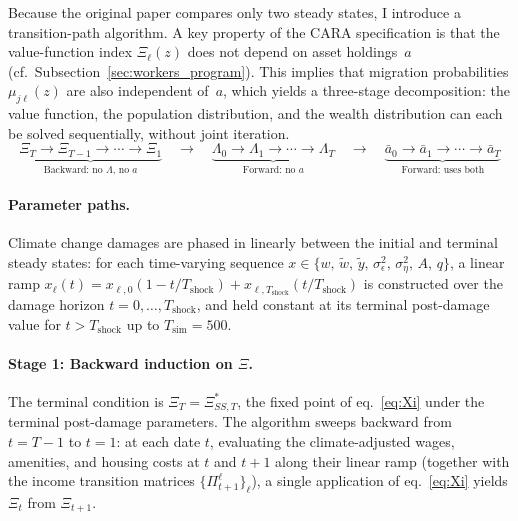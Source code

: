 \documentclass[11pt, a4paper]{article}
\begin{document}
Because the original paper compares only two steady states, I introduce a transition-path algorithm. A key property of the CARA specification is that the value-function index $\Xi_\ell(z)$ does not depend on asset holdings~$a$ (cf.\ Subsection~\ref{sec:workers_program}). This implies that migration probabilities $\mu_{j\ell}(z)$ are also independent of~$a$, which yields a three-stage decomposition: the value function, the population distribution, and the wealth distribution can each be solved sequentially, without joint iteration.
\begin{equation}
  \underbrace{\Xi_T \to \Xi_{T-1} \to \cdots \to \Xi_1}_{\text{Backward: no $\Lambda$, no $a$}}
  \quad\longrightarrow\quad
  \underbrace{\Lambda_0 \to \Lambda_1 \to \cdots \to \Lambda_T}_{\text{Forward: no $a$}}
  \quad\longrightarrow\quad
  \underbrace{\bar a_0 \to \bar a_1 \to \cdots \to \bar a_T}_{\text{Forward: uses both}}
  \label{eq:three_stage}
\end{equation}

\paragraph{Parameter paths.} Climate change damages are phased in linearly between the initial and terminal steady states: for each time-varying sequence $x \in \{w,\, \tilde w,\, \tilde y,\, \sigma^2_\epsilon,\, \sigma^2_\eta,\, A,\, q\}$, a linear ramp $x_\ell(t) = x_{\ell,0}(1 - t/T_{\text{shock}}) + x_{\ell,T_{\text{shock}}}(t/T_{\text{shock}})$ is constructed over the damage horizon $t = 0,\ldots,T_{\text{shock}}$, and held constant at its terminal post-damage value for $t > T_{\text{shock}}$ up to $T_{\text{sim}} = 500$.

\paragraph{Stage 1: Backward induction on $\Xi$.}
The terminal condition is $\Xi_T = \Xi^*_{SS,T}$, the fixed point of eq.~\eqref{eq:Xi} under the terminal post-damage parameters. The algorithm sweeps backward from $t = T{-}1$ to $t = 1$: at each date $t$, evaluating the climate-adjusted wages, amenities, and housing costs at $t$ and $t{+}1$ along their linear ramp (together with the income transition matrices $\{\Pi^\ell_{t+1}\}_\ell$), a single application of eq.~\eqref{eq:Xi} yields $\Xi_t$ from $\Xi_{t+1}$.
\end{document}
